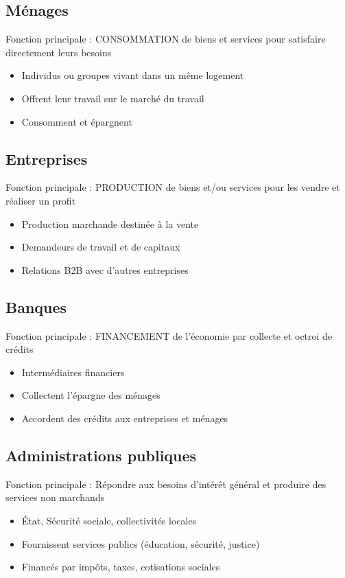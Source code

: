 \documentclass[12pt,a4paper]{article}
\begin{document}
\subsection{Ménages}
\begin{tcolorbox}[title=\textbf{POINT CLÉ}]
Fonction principale : CONSOMMATION de biens et services pour satisfaire directement leurs besoins
\end{tcolorbox}
\begin{itemize}
    \item Individus ou groupes vivant dans un même logement
    \item Offrent leur travail sur le marché du travail
    \item Consomment et épargnent
\end{itemize}

\subsection{Entreprises}
\begin{tcolorbox}[title=\textbf{POINT CLÉ}]
Fonction principale : PRODUCTION de biens et/ou services pour les vendre et réaliser un profit
\end{tcolorbox}
\begin{itemize}
    \item Production marchande destinée à la vente
    \item Demandeurs de travail et de capitaux
    \item Relations B2B avec d'autres entreprises
\end{itemize}

\subsection{Banques}
\begin{tcolorbox}[title=\textbf{POINT CLÉ}]
Fonction principale : FINANCEMENT de l'économie par collecte et octroi de crédits
\end{tcolorbox}
\begin{itemize}
    \item Intermédiaires financiers
    \item Collectent l'épargne des ménages
    \item Accordent des crédits aux entreprises et ménages
\end{itemize}

\subsection{Administrations publiques}
\begin{tcolorbox}[title=\textbf{POINT CLÉ}]
Fonction principale : Répondre aux besoins d'intérêt général et produire des services non marchands
\end{tcolorbox}
\begin{itemize}
    \item État, Sécurité sociale, collectivités locales
    \item Fournissent services publics (éducation, sécurité, justice)
    \item Financés par impôts, taxes, cotisations sociales
\end{itemize}
\end{document}
